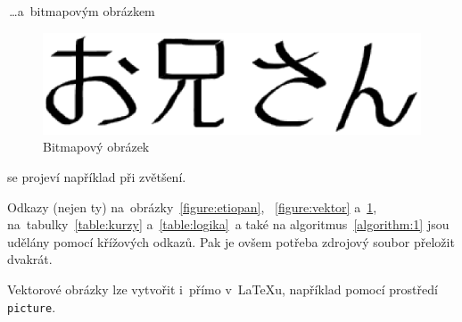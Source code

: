 \documentclass[11pt,a4paper]{article}
\begin{document}
    \bigskip
    \noindent\,\dots a~bitmapovým obrázkem
    \begin{figure}[tbh]
        \centering
        \includegraphics[scale=0.6]{oniisan2}
        \caption{Bitmapový obrázek}
        \label{figure:bitmap}
    \end{figure}

    \bigskip
    \noindent se projeví například při zvětšení.\par
    Odkazy (nejen ty) na~obrázky~\ref{figure:etiopan}, ~\ref{figure:vektor} a~\ref{figure:bitmap}, na~tabulky~\ref{table:kurzy} a~\ref{table:logika}~a také na algoritmus~\ref{algorithm:1} jsou udělány pomocí křížových odkazů. Pak je ovšem potřeba zdrojový soubor přeložit dvakrát.\par
    Vektorové obrázky lze vytvořit i~přímo v~{\LaTeX}u, například pomocí prostředí \texttt{picture}.

\pagebreak
\end{document}
